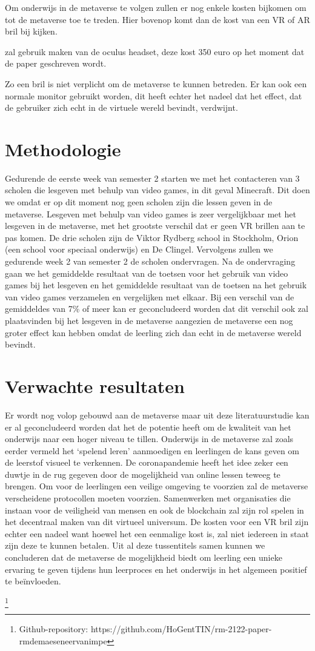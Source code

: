 \documentclass{hogent-article}
\begin{document}
Om onderwijs in de metaverse te volgen zullen er nog enkele kosten bijkomen om tot de metaverse toe te treden. Hier bovenop komt dan de kost van een VR of AR bril bij kijken.  

\textcite{Meta} zal gebruik maken van de oculus headset, deze kost 350 euro op het moment dat de paper geschreven wordt. 

Zo een bril is niet verplicht om de metaverse te kunnen betreden. Er kan ook een normale monitor gebruikt worden, dit heeft echter het nadeel dat het effect, dat de gebruiker zich echt in de virtuele wereld bevindt, verdwijnt. 

\section{Methodologie}
Gedurende de eerste week van semester 2 starten we met het contacteren van 3 scholen die lesgeven met behulp van video games, in dit geval Minecraft. Dit doen we omdat er op dit moment nog geen scholen zijn die lessen geven in de metaverse. Lesgeven met behulp van video games is zeer vergelijkbaar met het lesgeven in de metaverse, met het grootste verschil dat er geen VR brillen aan te pas komen.
De drie scholen zijn de Viktor Rydberg school in Stockholm, Orion (een school voor speciaal onderwijs) en De Clingel.
Vervolgens zullen we gedurende week 2 van semester 2 de scholen ondervragen. Na de ondervraging gaan we het gemiddelde resultaat van de toetsen voor het gebruik van video games bij het lesgeven en het gemiddelde resultaat van de toetsen na het gebruik van video games verzamelen en vergelijken met elkaar. Bij een verschil van de gemiddeldes van 7\% of meer kan er geconcludeerd worden dat dit verschil ook zal plaatsvinden bij het lesgeven in de metaverse aangezien de metaverse een nog groter effect kan hebben omdat de leerling zich dan echt in de metaverse wereld bevindt.

\section{Verwachte resultaten}
Er wordt nog volop gebouwd aan de metaverse maar uit deze literatuurstudie kan er al geconcludeerd worden dat het de potentie heeft om de kwaliteit van het onderwijs naar een hoger niveau te tillen. Onderwijs in de metaverse zal zoals eerder vermeld het ‘spelend leren’ aanmoedigen en leerlingen de kans geven om de leerstof visueel te verkennen. De coronapandemie heeft het idee zeker een duwtje in de rug gegeven door de mogelijkheid van online lessen teweeg te brengen. Om voor de leerlingen een veilige omgeving te voorzien zal de metaverse verscheidene protocollen moeten voorzien. Samenwerken met organisaties die instaan voor de veiligheid van mensen en ook de blockchain zal zijn rol spelen in het decentraal maken van dit virtueel universum. De kosten voor een VR bril zijn echter een nadeel want hoewel het een eenmalige kost is, zal niet iedereen in staat zijn deze te kunnen betalen. Uit al deze tussentitels samen kunnen we concluderen dat de metaverse de mogelijkheid biedt om leerling een unieke ervaring te geven tijdens hun leerproces en het onderwijs in het algemeen positief te beïnvloeden.

\printbibliography[heading=bibintoc]
\footnote{Github-repository: https://github.com/HoGentTIN/rm-2122-paper-rmdemaeseneervanimpe}
\end{document}
